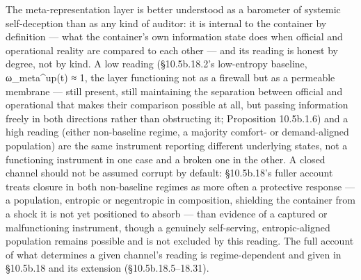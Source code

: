 \documentclass[
]{article}
\begin{document}
The meta-representation layer is better understood as a barometer of
systemic self-deception than as any kind of auditor: it is internal to
the container by definition --- what the container's own information
state does when official and operational reality are compared to each
other --- and its reading is honest by degree, not by kind. A low
reading (§10.5b.18.2's low-entropy baseline, ω\_meta\^{}up(t) ≈ 1, the
layer functioning not as a firewall but as a permeable membrane --- still
present, still maintaining the separation between official and
operational that makes their comparison possible at all, but passing
information freely in both directions rather than obstructing it;
Proposition 10.5b.1.6)
and a high reading (either non-baseline regime, a majority comfort- or
demand-aligned population) are the same instrument reporting different
underlying states, not a functioning instrument in one case and a broken
one in the other. A closed channel should not be assumed corrupt by
default: §10.5b.18's fuller account treats closure in both non-baseline
regimes as more often a protective response --- a population, entropic
or negentropic in composition, shielding the container from a shock it
is not yet positioned to absorb --- than evidence of a captured or
malfunctioning instrument, though a genuinely self-serving,
entropic-aligned population remains possible and is not excluded by this
reading. The full account of what determines a given channel's reading
is regime-dependent and given in §10.5b.18 and its extension
(§10.5b.18.5--18.31).
\end{document}
